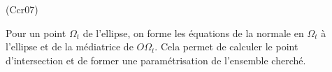 \begin{tiny}(Ccr07)\end{tiny} Pour un point $\Omega_t$ de l'ellipse, on forme les équations de la normale en $\Omega_t$ à l'ellipse et de la médiatrice de $O\Omega_t$. Cela permet de calculer le point d'intersection et de former une paramétrisation de l'ensemble cherché.